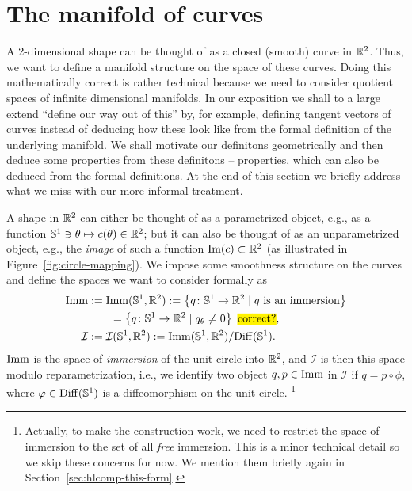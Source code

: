 \section{The manifold of curves}
\label{sec:manifold-curves}

A 2-dimensional shape can be thought of as a closed (smooth) curve in $\R^2$. Thus, we want to define a manifold structure on the space of these curves. Doing this mathematically correct is rather technical because we need to consider quotient spaces of infinite dimensional manifolds. In our exposition we shall to a large extend ``define our way out of this'' by, for example, defining tangent vectors of curves instead of deducing how these look like from the formal definition of the underlying manifold. We shall motivate our definitons geometrically and then deduce some properties from these definitons -- properties, which can also be deduced from the formal definitions. At the end of this section we briefly address what we miss with our more informal treatment.

A shape in $\R^2$ can either be thought of as a parametrized object, e.g., as a function $\S^1 \ni \theta \mapsto c(\theta) \in \R^2$; but it can also be thought of as an unparametrized object, e.g., the \textit{image} of such a function $\text{Im}(c) \subset \R^2$ (as illustrated in Figure~\ref{fig:circle-mapping}). We impose some smoothness structure on the curves and define the spaces we want to consider formally as
\begin{align*}
  \I & := \I(\S^1, \R^2)
       :=  \left\{ q\colon \S^1 \rightarrow \R^2 \mid q \text{ is an immersion} \right\} \\
     & \quad \quad = \left\{q\colon \S^1 \rightarrow \R^2 \mid q_{\theta} \not = 0 \right\} \text{ \hl{correct?}}, \\
  \mathcal{I}
     & := \mathcal{I}(\S^1, \R^2)  := \I(\S^1, \R^2)/\mathrm{Diff}(\S^1).
\end{align*}
$\I$ is the space of \textit{immersion} of the unit circle into $\R^2$, and $\mathcal{I}$ is then this space modulo reparametrization, i.e., we identify two object $q,p \in \I$ in $\mathcal{I}$ if $q=p \circ \phi$, where $\phi \in \mathrm{Diff}(\S^1)$ is a diffeomorphism on the unit circle.
\footnote{Actually, to make the construction work, we need to restrict the space of immersion to the set of all \textit{free} immersion. This is a minor technical detail so we skip these concerns for now. We mention them briefly again in Section~\ref{sec:hlcomp-this-form}.}

